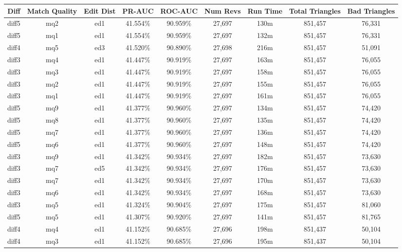 \begin{sidewaystable}[!ph]
  \begin{center}
    \begin{tabular}{|c|c|c||c|c||c|c|c|c|}
\hline
Diff & Match Quality & Edit Dist
        & PR-AUC & ROC-AUC
        & Num Revs & Run Time
        & Total Triangles & Bad Triangles \\
\hline
\hline
diff5 & mq2 & ed1 & 41.554\% & 90.959\% & 27,697 & 130m & 851,457 & 76,331 \\
diff5 & mq1 & ed1 & 41.554\% & 90.959\% & 27,697 & 132m & 851,457 & 76,331 \\
diff4 & mq5 & ed3 & 41.520\% & 90.890\% & 27,698 & 216m & 851,457 & 51,091 \\
diff3 & mq4 & ed1 & 41.447\% & 90.919\% & 27,697 & 163m & 851,457 & 76,055 \\
diff3 & mq3 & ed1 & 41.447\% & 90.919\% & 27,697 & 158m & 851,457 & 76,055 \\
diff3 & mq2 & ed1 & 41.447\% & 90.919\% & 27,697 & 155m & 851,457 & 76,055 \\
diff3 & mq1 & ed1 & 41.447\% & 90.919\% & 27,697 & 161m & 851,457 & 76,055 \\
diff5 & mq9 & ed1 & 41.377\% & 90.960\% & 27,697 & 134m & 851,457 & 74,420 \\
diff5 & mq8 & ed1 & 41.377\% & 90.960\% & 27,697 & 135m & 851,457 & 74,420 \\
diff5 & mq7 & ed1 & 41.377\% & 90.960\% & 27,697 & 136m & 851,457 & 74,420 \\
diff5 & mq6 & ed1 & 41.377\% & 90.960\% & 27,697 & 148m & 851,457 & 74,420 \\
diff3 & mq9 & ed1 & 41.342\% & 90.934\% & 27,697 & 182m & 851,457 & 73,630 \\
diff3 & mq7 & ed5 & 41.342\% & 90.934\% & 27,697 & 176m & 851,457 & 73,630 \\
diff3 & mq7 & ed1 & 41.342\% & 90.934\% & 27,697 & 170m & 851,457 & 73,630 \\
diff3 & mq6 & ed1 & 41.342\% & 90.934\% & 27,697 & 168m & 851,457 & 73,630 \\
diff3 & mq5 & ed1 & 41.324\% & 90.904\% & 27,697 & 175m & 851,457 & 81,060 \\
diff5 & mq5 & ed1 & 41.307\% & 90.920\% & 27,697 & 141m & 851,457 & 81,765 \\
diff4 & mq4 & ed1 & 41.152\% & 90.685\% & 27,696 & 198m & 851,437 & 50,104 \\
diff4 & mq3 & ed1 & 41.152\% & 90.685\% & 27,696 & 195m & 851,437 & 50,104 \\

\end{tabular}
\end{center}
\end{sidewaystable}
